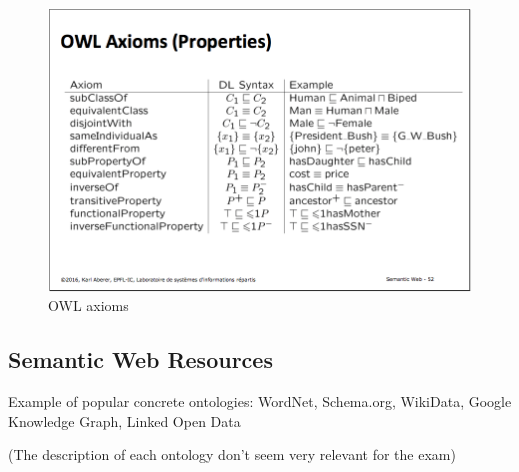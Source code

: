 \begin{figure}[H]
\begin{center}
\includegraphics[width=1\linewidth]{figures/owl_axioms.png}
\end{center}
\caption{OWL axioms}
\end{figure}


\subsection{Semantic Web Resources}
Example of popular concrete ontologies: WordNet, Schema.org, WikiData, Google Knowledge Graph, Linked Open Data

(The description of each ontology don't seem very relevant for the exam)